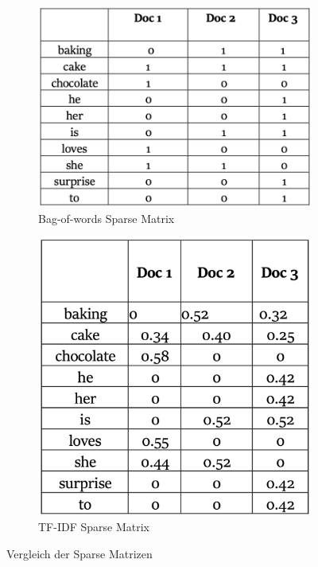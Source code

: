 \begin{figure}[h]
    \begin{subfigure}{0.5\textwidth}
        \centering
        \includegraphics[scale=0.5]{static/table_bow.png}
        \caption{\label{fig:table_bow} Bag-of-words Sparse Matrix \cite{Buddhadev2025}}
    \end{subfigure}
    \begin{subfigure}{0.5\textwidth}
        \centering
        \includegraphics[scale=0.25]{static/table_tf-idf.png}
        \caption{\label{fig:table_tf-idf} TF-IDF Sparse Matrix \cite{Buddhadev2025}}
    \end{subfigure}
    
    \caption{Vergleich der Sparse Matrizen}
    \label{fig:vlg_sparse_matrizen}
\end{figure}

